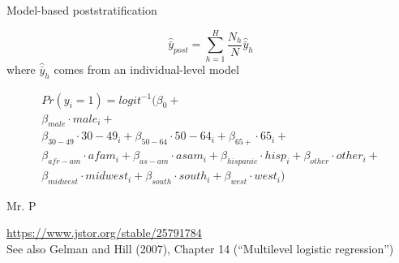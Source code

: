 \documentclass[aspectratio=169]{beamer}
\begin{document}
\begin{frame}{Model-based poststratification}

\begin{equation*}
\hat{\bar{y}}_{post} = \sum_{h=1}^H \frac{N_h}{N} \hat{\bar{y}}_h
\end{equation*}
where
$\hat{\bar{y}}_h$ comes from an individual-level model

\begin{align*}
Pr(y_i = 1) = logit^{-1} (\beta_0 + \\
 \beta_{male} \cdot male_i+ \\
 \beta_{30-49} \cdot 30-49_i + \beta_{50 - 64} \cdot 50-64_i+ \beta_{65+} \cdot 65_i +\\
 \beta_{afr-am} \cdot afam_i + \beta_{as-am} \cdot asam_i+ \beta_{hispanic} \cdot hisp_i + \beta_{other} \cdot other_i + \\
 \beta_{midwest} \cdot midwest_i + \beta_{south} \cdot south_i + \beta_{west} \cdot west_i)
\end{align*}

\end{frame}
\begin{frame}{Mr. P}

\begin{center}
\end{center}

\vfill
\url{https://www.jstor.org/stable/25791784} \\ See also Gelman and Hill (2007), Chapter 14 (``Multilevel logistic regression'')

\end{frame}
\end{document}
